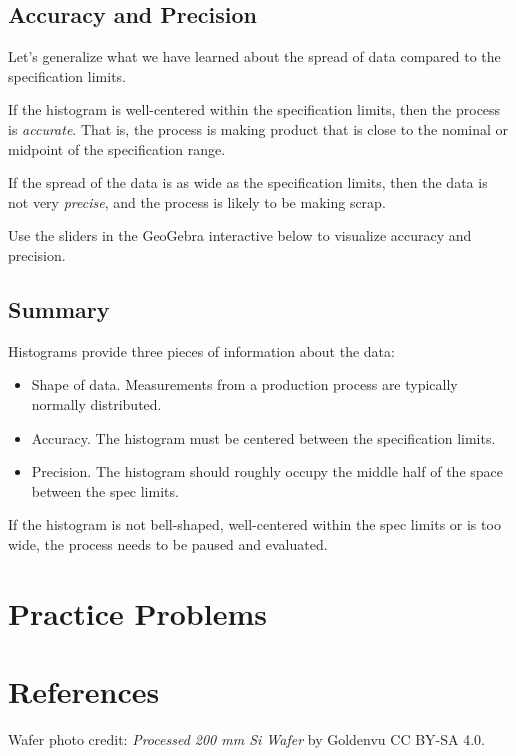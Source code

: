 \documentclass{ximera}
\begin{document}
\begin{onlineOnly}
\begin{center} 
\end{center}
\end{onlineOnly}


\subsection*{Accuracy and Precision}

Let's generalize what we have learned about the spread of data compared to the specification limits.

If the histogram is well-centered within the specification limits, then the process is \emph{accurate}. That is, the process is making product that is close to the nominal or midpoint of the specification range.

If the spread of the data is as wide as the specification limits, then the data is not very \emph{precise}, and the process is likely to be making scrap.

Use the sliders in the GeoGebra interactive below to visualize accuracy and precision.
\begin{onlineOnly}
\begin{center} 
\end{center}
\end{onlineOnly}

\subsection*{Summary}
Histograms provide three pieces of information about the data:
\begin{itemize}
    \item Shape of data.  Measurements from a production process are typically normally distributed.  
    \item Accuracy.  The histogram must be centered between the specification limits.  
    \item Precision.  The histogram should roughly occupy the middle half of the space between the spec limits. 
\end{itemize}
If the histogram is not bell-shaped, well-centered within the spec limits or is too wide, the process needs to be paused and evaluated.



\section*{Practice Problems}

\section*{References}
Wafer photo credit: \textit{Processed 200 mm Si Wafer} by Goldenvu CC BY-SA 4.0.
\end{document}

